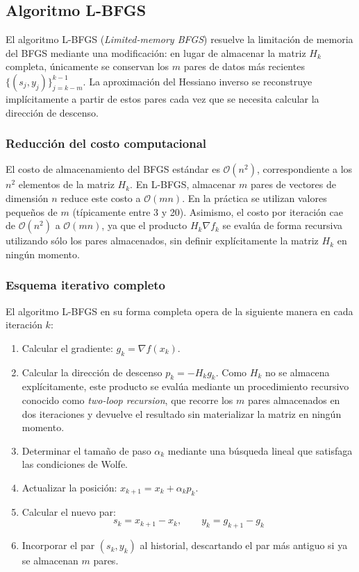\subsection{Algoritmo L-BFGS}

El algoritmo L-BFGS (\textit{Limited-memory BFGS}) resuelve la limitación de memoria del BFGS mediante una modificación: en lugar de almacenar la matriz \(H_k\) completa, únicamente se conservan los \(m\) pares de datos más recientes \(\{(s_j, y_j)\}_{j=k-m}^{k-1}\). La aproximación del Hessiano inverso se reconstruye implícitamente a partir de estos pares cada vez que se necesita calcular la dirección de descenso.

\subsubsection*{Reducción del costo computacional}

El costo de almacenamiento del BFGS estándar es \(\mathcal{O}(n^2)\), correspondiente a los \(n^2\) elementos de la matriz \(H_k\). En L-BFGS, almacenar \(m\) pares de vectores de dimensión \(n\) reduce este costo a \(\mathcal{O}(mn)\). En la práctica se utilizan valores pequeños de \(m\) (típicamente entre 3 y 20). Asimismo, el costo por iteración cae de \(\mathcal{O}(n^2)\) a \(\mathcal{O}(mn)\), ya que el producto \(H_k \nabla f_k\) se evalúa de forma recursiva utilizando sólo los pares almacenados, sin definir explícitamente la matriz \(H_k\) en ningún momento.

\subsubsection*{Esquema iterativo completo}

El algoritmo L-BFGS en su forma completa opera de la siguiente manera en cada iteración \(k\):

\begin{enumerate}
    \item Calcular el gradiente: \( g_k = \nabla f(x_k) \).
    \item Calcular la dirección de descenso \(p_k = -H_k g_k\). Como \(H_k\) no se almacena explícitamente, este producto se evalúa mediante un procedimiento recursivo conocido como \textit{two-loop recursion}, que recorre los \(m\) pares almacenados en dos iteraciones y devuelve el resultado sin materializar la matriz en ningún momento.
    \item Determinar el tamaño de paso \(\alpha_k\) mediante una búsqueda lineal que satisfaga las condiciones de Wolfe.
    \item Actualizar la posición: \( x_{k+1} = x_k + \alpha_k p_k \).
    \item Calcular el nuevo par:
    \[
    s_k = x_{k+1} - x_k, \qquad y_k = g_{k+1} - g_k
    \]
    \item Incorporar el par \((s_k, y_k)\) al historial, descartando el par más antiguo si ya se almacenan \(m\) pares.
\end{enumerate}

